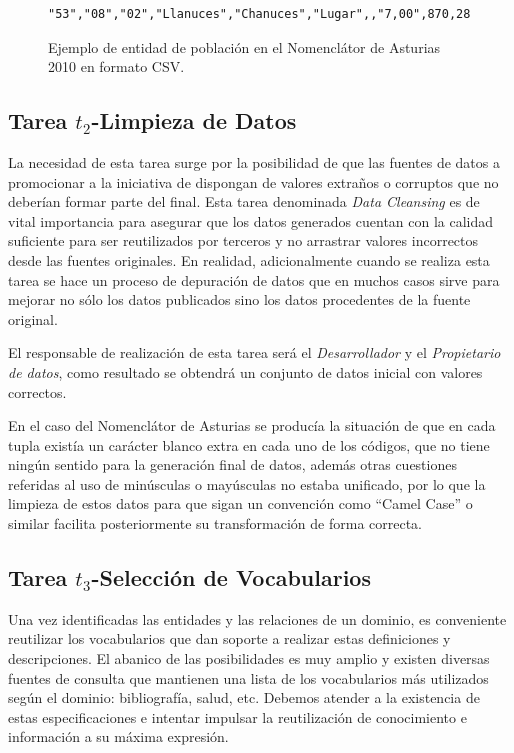 \begin{figure}[!htp]
\begin{lstlisting}
"53","08","02","Llanuces","Chanuces","Lugar",,"7,00",870,28,17,11,59,15,44
\end{lstlisting}
	\caption{Ejemplo de entidad de población en el Nomenclátor de Asturias 2010 en formato CSV.}
	\label{fig:ejemplo-datos-csv}
\end{figure}


\subsection{Tarea $t_2$-Limpieza de Datos}
La necesidad de esta tarea surge por la posibilidad de que las fuentes de datos a promocionar a la iniciativa de \linkeddata
dispongan de valores extraños o corruptos que no deberían formar parte del \dataset final. Esta tarea
denominada \textit{Data Cleansing} es de vital importancia para asegurar que los datos generados cuentan con la calidad suficiente para
ser reutilizados por terceros y no arrastrar valores incorrectos desde las fuentes originales. En realidad, adicionalmente
cuando se realiza esta tarea se hace un proceso de depuración de datos que en muchos casos sirve para mejorar no sólo los 
datos publicados sino los datos procedentes de la fuente original.

El responsable de realización de esta tarea será el \textit{Desarrollador} y el \textit{Propietario de datos}, como resultado se obtendrá
un conjunto de datos inicial con valores correctos.

En el caso del Nomenclátor de Asturias se producía la situación de que en cada tupla existía un carácter blanco extra
en cada uno de los códigos, que no tiene ningún sentido para la generación final de datos, además otras cuestiones referidas al 
uso de minúsculas o mayúsculas no estaba unificado, por lo que la limpieza de estos datos para que sigan un convención
como ``Camel Case'' o similar facilita posteriormente su transformación de forma correcta.


\subsection{Tarea $t_3$-Selección de Vocabularios}
Una vez identificadas las entidades y las relaciones de un dominio, es conveniente
reutilizar los vocabularios que dan soporte a realizar estas definiciones y descripciones. El abanico
de las posibilidades es muy amplio y existen diversas fuentes de consulta que mantienen una lista
de los vocabularios más utilizados según el dominio: bibliografía, salud, etc. Debemos atender
a la existencia de estas especificaciones e intentar impulsar la reutilización de conocimiento
e información a su máxima expresión. 

